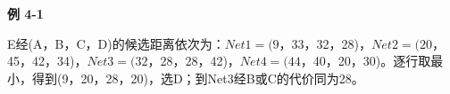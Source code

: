 {\color{ink}\bfseries 例 4-1}\par\vspace{1bp}E经(A，B，C，D)的候选距离依次为：\(Net1=\allowbreak{}(9\)，33，32，28)，\(Net2=\allowbreak{}(20\)，45，42，34)，\(Net3=\allowbreak{}(32\)，28，28，42)，\(Net4=\allowbreak{}(44\)，40，20，30)。逐行取最小，得到(9，20，28，20)，选D；到Net3经B或C的代价同为28。
